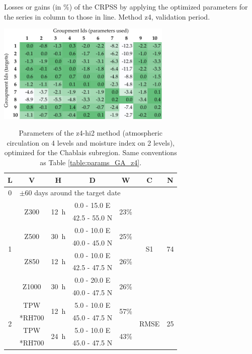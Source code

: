 \documentclass[twocol]{ametsoc}
\begin{document}
\begin{table}[htb]
	\caption{Losses or gains (in \%) of the CRPSS by applying the optimized parameters for the series in column to those in line. Method z4, validation period.}
	\centerline{\includegraphics[width=8.3cm]{figures/table_crossing_z4_valid.pdf}}
	\label{table:crossing_z4_valid}
\end{table}


\clearpage


\begin{table}[htbp]
	\footnotesize
	\caption{Parameters of the z4-hi2 method (atmospheric circulation on 4 levels and moisture index on 2 levels), optimized for the Chablais subregion. Same conventions as Table \ref{table:params_GA_z4}.}
	\begin{center}
		\begin{tabular}{ccccccc}
			\hline \textbf{L} & \textbf{V} & \textbf{H} & \textbf{D} & \textbf{W} & \textbf{C} & \textbf{N} \\ 
			\hline 
			0 & \multicolumn{6}{l}{$\pm 60$ days around the target date} \\
			\hline 
			\multirow{8}{*}{1} &  \multirow{2}{*}{Z300} & \multirow{2}{*}{12~h} & 0.0 - 15.0 \degree E & \multirow{2}{*}{23\%} & \multirow{8}{*}{S1} & \multirow{8}{*}{74} \\
			& & & 42.5 - 55.0 \degree N & & & \\ 
			& \multirow{2}{*}{Z500} & \multirow{2}{*}{30~h} & 0.0 - 10.0 \degree E & \multirow{2}{*}{25\%} & & \\ 
			& & & 40.0 - 45.0 \degree N & & & \\ 
			& \multirow{2}{*}{Z850} & \multirow{2}{*}{12~h} & 0.0 - 10.0 \degree E & \multirow{2}{*}{26\%} & & \\ 
			& & & 42.5 - 47.5 \degree N & & & \\ 
			& \multirow{2}{*}{Z1000} & \multirow{2}{*}{30~h} & 0.0 - 20.0 \degree E & \multirow{2}{*}{26\%} & & \\ 
			& & & 40.0 - 47.5 \degree N & & & \\ 
			\hline 
			\multirow{4}{*}{2} & TPW & \multirow{2}{*}{12~h} & 5.0 - 10.0 \degree E & \multirow{2}{*}{57\%} & \multirow{4}{*}{RMSE} & \multirow{4}{*}{25} \\
			& *RH700 & & 45.0 - 47.5 \degree N & & & \\ 
			& TPW & \multirow{2}{*}{24~h} & 5.0 - 10.0 \degree E & \multirow{2}{*}{43\%} & & \\ 
			& *RH700 & & 45.0 - 47.5 \degree N & & & \\ 
			\hline 
		\end{tabular} 
	\end{center}
	\label{table:params_GA_z4_hi2}
\end{table}
\end{document}
